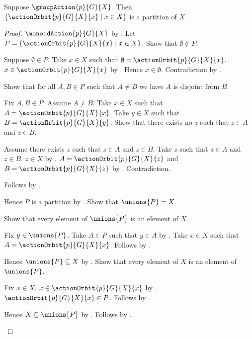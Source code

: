 \begin{theorem}\label{group_action_orbits_partition}
    Suppose $\groupAction{p}{G}{X}$.
    Then
        $\{\actionOrbit{p}{G}{X}{x}\mid x\in X\}$
        is a partition of $X$.
\end{theorem}
\begin{proof}
    $\monoidAction{p}{G}{X}$ by
        .
    Let $P=\{\actionOrbit{p}{G}{X}{x}\mid x\in X\}$.
    Show that $\emptyset\notin P$.
    \begin{subproof}
        Suppose $\emptyset\in P$.
        Take $x\in X$ such that
            $\emptyset=\actionOrbit{p}{G}{X}{x}$.
        $x\in\actionOrbit{p}{G}{X}{x}$ by
            .
        Hence $x\in\emptyset$.
        Contradiction by .
    \end{subproof}
    Show that for all $A,B\in P$ such that $A\neq B$ we have
        $A$ is disjoint from $B$.
    \begin{subproof}
        Fix $A,B\in P$.
        Assume $A\neq B$.
        Take $x\in X$ such that $A=\actionOrbit{p}{G}{X}{x}$.
        Take $y\in X$ such that $B=\actionOrbit{p}{G}{X}{y}$.
        Show that there exists no $z$ such that $z\in A$ and $z\in B$.
        \begin{subproof}
            Assume there exists $z$ such that $z\in A$ and $z\in B$.
            Take $z$ such that $z\in A$ and $z\in B$.
            $z\in X$ by .
            $A=\actionOrbit{p}{G}{X}{z}$ and
                $B=\actionOrbit{p}{G}{X}{z}$ by
                .
            Contradiction.
        \end{subproof}
        Follows by .
    \end{subproof}
    Hence $P$ is a partition by .
    Show that $\unions{P}=X$.
    \begin{subproof}
        Show that every element of $\unions{P}$ is an element of $X$.
        \begin{subproof}
            Fix $y\in\unions{P}$.
            Take $A\in P$ such that $y\in A$ by .
            Take $x\in X$ such that
                $A=\actionOrbit{p}{G}{X}{x}$.
            Follows by .
        \end{subproof}
        Hence $\unions{P}\subseteq X$ by .
        Show that every element of $X$ is an element of $\unions{P}$.
        \begin{subproof}
            Fix $x\in X$.
            $x\in\actionOrbit{p}{G}{X}{x}$ by
                .
            $\actionOrbit{p}{G}{X}{x}\in P$.
            Follows by .
        \end{subproof}
        Hence $X\subseteq\unions{P}$ by .
        Follows by .
    \end{subproof}
\end{proof}

